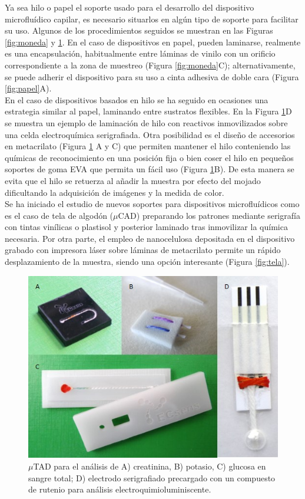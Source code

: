 \documentclass{article}
\begin{document}
Ya sea hilo o papel el soporte usado para el desarrollo del dispositivo microfluídico capilar, es necesario situarlos en algún tipo de soporte para facilitar su uso. Algunos de los procedimientos seguidos se muestran en las Figuras \ref{fig:moneda} y \ref{fig:hilo}. En el caso de dispositivos en papel, pueden laminarse, realmente es una encapsulación, habitualmente entre láminas de vinilo con un orificio correspondiente a la zona de muestreo (Figura \ref{fig:moneda}C); alternativamente, se puede adherir el dispositivo para su uso a cinta adhesiva de doble cara (Figura \ref{fig:papel}A). \\

En el caso de dispositivos basados en hilo se ha seguido en ocasiones una estrategia similar al papel, laminando entre sustratos flexibles. En la Figura \ref{fig:hilo}D se muestra un ejemplo de laminación de hilo con reactivos inmovilizados sobre una celda electroquímica serigrafiada. Otra posibilidad es el diseño de accesorios en metacrilato (Figura \ref{fig:hilo} A y C) que permiten mantener el hilo conteniendo las químicas de reconocimiento en una posición fija o bien coser el hilo en pequeños soportes de goma EVA que permita un fácil uso (Figura \ref{fig:hilo}B). De esta manera se evita que el hilo se retuerza al añadir la muestra por efecto del mojado dificultando la adquisición de imágenes y la medida de color.\\

Se ha iniciado el estudio de nuevos soportes para dispositivos microfluídicos como es el caso de tela de algodón ($\mu$CAD) preparando los patrones mediante serigrafía con tintas vinílicas o plastisol y posterior laminado tras inmovilizar la química necesaria. Por otra parte, el empleo de nanocelulosa depositada en el dispositivo grabado con impresora láser sobre láminas de metacrilato permite un rápido desplazamiento de la muestra, siendo una opción interesante (Figura \ref{fig:tela}).\\

\begin{figure}[h]
\includegraphics[width=\textwidth]{hilo}
\caption{ $\mu$TAD para el análisis de A) creatinina, B) potasio, C) glucosa en sangre total; D) electrodo serigrafiado precargado con un compuesto de rutenio para análisis electroquimioluminiscente.}
\label{fig:hilo}
\end{figure}
\end{document}
